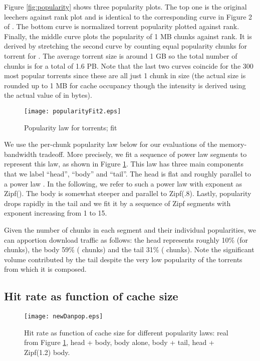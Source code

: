 \documentclass [11pt]{article}
\begin{document}
Figure \ref{fig:popularity} shows three popularity plots. The top one is the original leechers against rank plot and is identical to the corresponding curve in Figure 2 of \cite{DC10}. The bottom curve is normalized torrent popularity  plotted against rank. Finally, the middle curve plots the popularity of 1 MB chunks against rank. It is derived by stretching the second curve by counting  equal popularity chunks for torrent  for . The average torrent size is around 1 GB so the total number of chunks is  for a total of 1.6 PB.  Note that the last two curves coincide for the 300 most popular torrents since these are all just 1 chunk in size (the actual size is rounded up to 1 MB for cache occupancy though the intensity  is derived using the actual value of  in bytes).

\begin{figure}[tp]
 \centering
 \texttt{[image: popularityFit2.eps]}
 \caption{Popularity law for torrents; fit }
 \label{fig:popularityfit}
\end{figure}

We use the per-chunk popularity law below for our evaluations of the memory-bandwidth tradeoff. More precisely, we fit a sequence of power law segments to represent this law, as shown in Figure \ref{fig:popularityfit}. This law has three main components that we label ``head'', ``body'' and ``tail''. The head is flat and roughly parallel to a power law . In the following, we refer to such a power law with exponent  as Zipf(). The body is somewhat steeper and parallel to Zipf(.8). Lastly, popularity drops rapidly in the tail and we fit it by a sequence of Zipf segments with exponent increasing from 1 to 15.  

Given the number of chunks in each segment and their individual popularities, we can apportion download traffic as follows: the head represents roughly 10\% (for  chunks), the body 59\% ( chunks) and the tail 31\% ( chunks). Note the significant volume contributed by the tail despite the very low popularity of the torrents from which it is composed. 


\subsection{Hit rate as function of cache size}
\label{sec:hitvcache}

\begin{figure}[tp]
 \centering
 \texttt{[image: newDanpop.eps]}
 \caption{Hit rate as function of cache size for different popularity laws: real from Figure \ref{fig:popularityfit}, head + body, body alone, body + tail, head + Zipf(1.2) body.}
 \label{fig:Danpop}
\end{figure}
\end{document}
